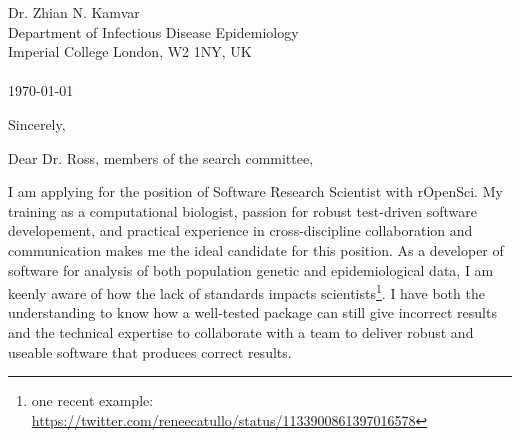 


\clearpage
\begin{flushright}
  Dr. Zhian N. Kamvar\\
  Department of Infectious Disease Epidemiology\\
  Imperial College London, W2 1NY, UK\\
  \phantom{menace}\\
  \today
\end{flushright}
\closing{Sincerely,} %

Dear Dr. Ross, members of the search committee,\\
\phantom{tollbooth}

I am applying for the position of Software Research Scientist with rOpenSci. My
training as a computational biologist, passion for robust test-driven software
developement, and practical experience in cross-discipline collaboration and
communication  makes me the ideal candidate for this position. As a developer
of software for analysis of both population genetic and epidemiological data, I
am keenly aware of how the lack of standards impacts scientists\footnote{one
recent example:
\url{https://twitter.com/reneecatullo/status/1133900861397016578}}. I have both
the understanding to know how a well-tested package can still give incorrect
results and the technical expertise to collaborate with a team to deliver
robust and useable software that produces correct results.


